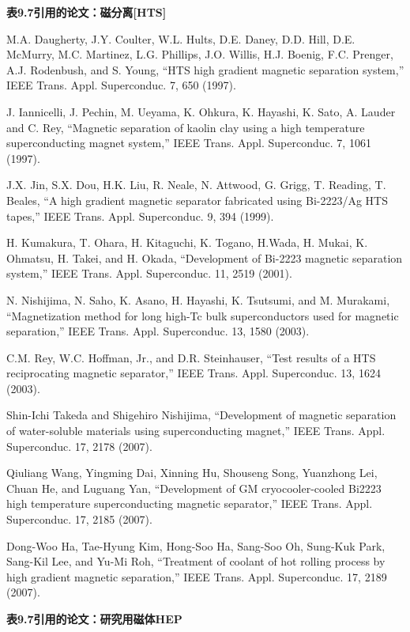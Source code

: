 \noindent \textbf{表9.7引用的论文：磁分离[HTS] }

\noindent [9.259] M.A. Daugherty, J.Y. Coulter, W.L. Hults, D.E. Daney, D.D. Hill, D.E. McMurry,
M.C. Martinez, L.G. Phillips, J.O. Willis, H.J. Boenig, F.C. Prenger, A.J. Rodenbush,
and S. Young, ``HTS high gradient magnetic separation system,” IEEE
Trans. Appl. Superconduc. 7, 650 (1997).

\noindent [9.260] J. Iannicelli, J. Pechin, M. Ueyama, K. Ohkura, K. Hayashi, K. Sato, A. Lauder
and C. Rey, ``Magnetic separation of kaolin clay using a high temperature superconducting magnet system,” IEEE Trans. Appl. Superconduc. 7, 1061 (1997).

\noindent [9.261] J.X. Jin, S.X. Dou, H.K. Liu, R. Neale, N. Attwood, G. Grigg, T. Reading,
T. Beales, ``A high gradient magnetic separator fabricated using Bi-2223/Ag HTS
tapes,” IEEE Trans. Appl. Superconduc. 9, 394 (1999).

\noindent [9.262] H. Kumakura, T. Ohara, H. Kitaguchi, K. Togano, H.Wada, H. Mukai, K. Ohmatsu,
H. Takei, and H. Okada, ``Development of Bi-2223 magnetic separation system,”
IEEE Trans. Appl. Superconduc. 11, 2519 (2001).

\noindent [9.263] N. Nishijima, N. Saho, K. Asano, H. Hayashi, K. Tsutsumi, and M. Murakami,
``Magnetization method for long high-Tc bulk superconductors used for magnetic
separation,” IEEE Trans. Appl. Superconduc. 13, 1580 (2003).

\noindent [9.264] C.M. Rey, W.C. Hoffman, Jr., and D.R. Steinhauser, ``Test results of a HTS reciprocating
magnetic separator,” IEEE Trans. Appl. Superconduc. 13, 1624 (2003).

\noindent [9.265] Shin-Ichi Takeda and Shigehiro Nishijima, ``Development of magnetic separation
of water-soluble materials using superconducting magnet,” IEEE Trans. Appl.
Superconduc. 17, 2178 (2007).

\noindent [9.266] Qiuliang Wang, Yingming Dai, Xinning Hu, Shouseng Song, Yuanzhong Lei,
Chuan He, and Luguang Yan, ``Development of GM cryocooler-cooled Bi2223
high temperature superconducting magnetic separator,” IEEE Trans. Appl. Superconduc.
17, 2185 (2007).

\noindent [9.267] Dong-Woo Ha, Tae-Hyung Kim, Hong-Soo Ha, Sang-Soo Oh, Sung-Kuk Park,
Sang-Kil Lee, and Yu-Mi Roh, ``Treatment of coolant of hot rolling process by high
gradient magnetic separation,” IEEE Trans. Appl. Superconduc. 17, 2189 (2007).

\noindent \textbf{表9.7引用的论文：研究用磁体HEP }


